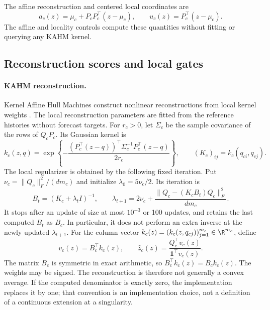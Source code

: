The affine reconstruction and centered local coordinates are
\begin{equation}
 a_c(z)=\mu_c+P_cP_c^\top(z-\mu_c),
 \qquad u_c(z)=P_c^\top(z-\mu_c).
 \label{eq:nf-affine}
\end{equation}
The affine and locality controls compute these quantities without fitting or
querying any KAHM kernel.

\subsection{Reconstruction scores and local gates}
\label{sec:nf-gates}

\paragraph{KAHM reconstruction.}
Kernel Affine Hull Machines construct nonlinear reconstructions from local
kernel weights \citep{Kumar2024KAHM}.  The local reconstruction parameters are fitted from the reference
histories without forecast targets.  For $r_c>0$, let $\Sigma_c$ be the sample
covariance of the rows of $Q_cP_c$.  Its Gaussian kernel is
\begin{equation}
 k_c(z,q)=\exp\!\left\{-\frac{
  (P_c^\top(z-q))^\top\Sigma_c^{-1}P_c^\top(z-q)}{2r_c}\right\},
 \qquad (K_c)_{ij}=k_c(q_{ci},q_{cj}).
 \label{eq:nf-kahm-kernel}
\end{equation}
The local regularizer is obtained by the following fixed iteration. Put
$\nu_c=\|Q_c\|_F^2/(dm_c)$ and initialize $\lambda_0=5\nu_c/2$.  Its iteration is
\begin{equation}
 B_t=(K_c+\lambda_t I)^{-1},\qquad
 \lambda_{t+1}=2\nu_c+
 \frac{\|Q_c-(K_cB_t)Q_c\|_F^2}{dm_c}.
 \label{eq:nf-local-regularizer}
\end{equation}
It stops after an update of size at most $10^{-3}$ or 100 updates, and
retains the last computed $B_t$ as $B_c$.  In particular, it does not perform
an extra inverse at the newly updated $\lambda_{t+1}$.
For the column vector $k_c(z)=(k_c(z,q_{cj}))_{j=1}^{m_c}\in\R^{m_c}$, define
\begin{equation}
 v_c(z)=B_c^\top k_c(z),\qquad
 \widehat z_c(z)=\frac{Q_c^\top v_c(z)}{\mathbf 1^\top v_c(z)}.
 \label{eq:nf-reconstruction}
\end{equation}
The matrix $B_c$ is symmetric in exact arithmetic, so $B_c^\top k_c(z)=B_c k_c(z)$.
The weights may be signed.  The reconstruction is therefore not generally a
convex average.  If the computed denominator is exactly zero, the implementation replaces
it by one; that convention is an implementation choice, not
a definition of a continuous extension at a singularity.

